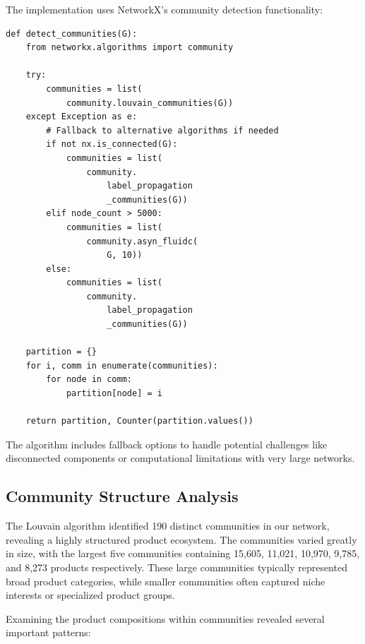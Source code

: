 \documentclass[conference]{IEEEtran}
\begin{document}
The implementation uses NetworkX's community detection functionality:

\begin{lstlisting}
def detect_communities(G):
    from networkx.algorithms import community
    
    try:
        communities = list(
            community.louvain_communities(G))
    except Exception as e:
        # Fallback to alternative algorithms if needed
        if not nx.is_connected(G):
            communities = list(
                community.
                    label_propagation
                    _communities(G))
        elif node_count > 5000:
            communities = list(
                community.asyn_fluidc(
                    G, 10))
        else:
            communities = list(
                community.
                    label_propagation
                    _communities(G))
    
    partition = {}
    for i, comm in enumerate(communities):
        for node in comm:
            partition[node] = i
            
    return partition, Counter(partition.values())
\end{lstlisting}

The algorithm includes fallback options to handle potential challenges like disconnected components or computational limitations with very large networks.

\subsection{Community Structure Analysis}
\label{sec:community-analysis}
The Louvain algorithm identified 190 distinct communities in our network, revealing a highly structured product ecosystem. The communities varied greatly in size, with the largest five communities containing 15,605, 11,021, 10,970, 9,785, and 8,273 products respectively. These large communities typically represented broad product categories, while smaller communities often captured niche interests or specialized product groups.

Examining the product compositions within communities revealed several important patterns:
\end{document}
